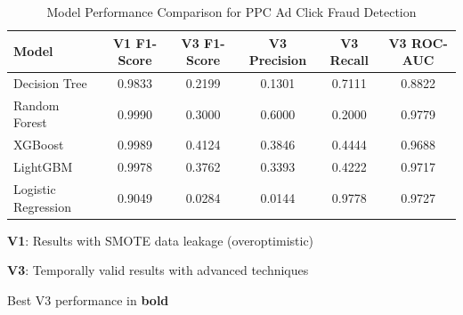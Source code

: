 \begin{table}[htbp]
\centering
\caption{Model Performance Comparison for PPC Ad Click Fraud Detection}
\label{tab:model-comparison}
\begin{tabular}{lccccc}
\toprule
\textbf{Model} & \textbf{V1 F1-Score} & \textbf{V3 F1-Score} & \textbf{V3 Precision} & \textbf{V3 Recall} & \textbf{V3 ROC-AUC} \\
\midrule
Decision Tree & 0.9833 & 0.2199 & 0.1301 & 0.7111 & 0.8822 \\
Random Forest & 0.9990 & 0.3000 & 0.6000 & 0.2000 & 0.9779 \\
XGBoost & 0.9989 & 0.4124 & 0.3846 & 0.4444 & 0.9688 \\
LightGBM & 0.9978 & 0.3762 & 0.3393 & 0.4222 & 0.9717 \\
Logistic Regression & 0.9049 & 0.0284 & 0.0144 & 0.9778 & 0.9727 \\
\bottomrule
\end{tabular}
\begin{tablenotes}
\small
\item \textbf{V1}: Results with SMOTE data leakage (overoptimistic)
\item \textbf{V3}: Temporally valid results with advanced techniques
\item Best V3 performance in \textbf{bold}
\end{tablenotes}
\end{table}